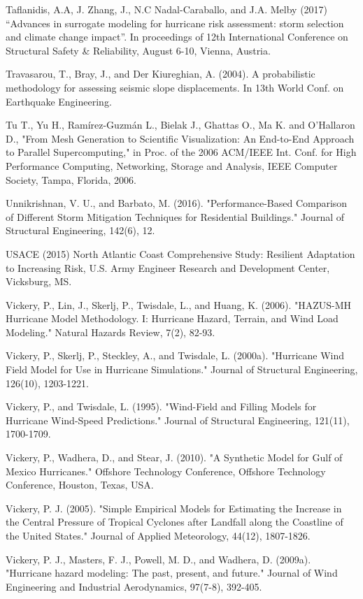 Taflanidis, A.A, J. Zhang, J., N.C Nadal-Caraballo, and J.A. Melby (2017) “Advances in surrogate modeling for hurricane risk assessment: storm selection and climate change impact”. In proceedings of 12th International Conference on Structural Safety & Reliability, August 6-10, Vienna, Austria.

Travasarou, T., Bray, J., and Der Kiureghian, A. (2004). A probabilistic methodology for assessing seismic slope displacements. In 13th World Conf. on Earthquake Engineering.

Tu T., Yu H., Ramírez-Guzmán L., Bielak J., Ghattas O., Ma K. and O'Hallaron D., "From Mesh Generation to Scientific Visualization: An End-to-End Approach to Parallel Supercomputing," in Proc. of the 2006 ACM/IEEE Int. Conf. for High Performance Computing, Networking, Storage and Analysis, IEEE Computer Society, Tampa, Florida, 2006.

Unnikrishnan, V. U., and Barbato, M. (2016). "Performance-Based Comparison of Different Storm Mitigation Techniques for Residential Buildings." Journal of Structural Engineering, 142(6), 12.

USACE (2015) North Atlantic Coast Comprehensive Study: Resilient Adaptation to Increasing Risk, U.S. Army Engineer Research and Development Center, Vicksburg, MS. 

Vickery, P., Lin, J., Skerlj, P., Twisdale, L., and Huang, K. (2006). "HAZUS-MH Hurricane Model Methodology. I: Hurricane Hazard, Terrain, and Wind Load Modeling." Natural Hazards Review, 7(2), 82-93.

Vickery, P., Skerlj, P., Steckley, A., and Twisdale, L. (2000a). "Hurricane Wind Field Model for Use in Hurricane Simulations." Journal of Structural Engineering, 126(10), 1203-1221.

Vickery, P., and Twisdale, L. (1995). "Wind-Field and Filling Models for Hurricane Wind-Speed Predictions." Journal of Structural Engineering, 121(11), 1700-1709.

Vickery, P., Wadhera, D., and Stear, J. (2010). "A Synthetic Model for Gulf of Mexico Hurricanes." Offshore Technology Conference, Offshore Technology Conference, Houston, Texas, USA.

Vickery, P. J. (2005). "Simple Empirical Models for Estimating the Increase in the Central Pressure of Tropical Cyclones after Landfall along the Coastline of the United States." Journal of Applied Meteorology, 44(12), 1807-1826.

Vickery, P. J., Masters, F. J., Powell, M. D., and Wadhera, D. (2009a). "Hurricane hazard modeling: The past, present, and future." Journal of Wind Engineering and Industrial Aerodynamics, 97(7-8), 392-405.

